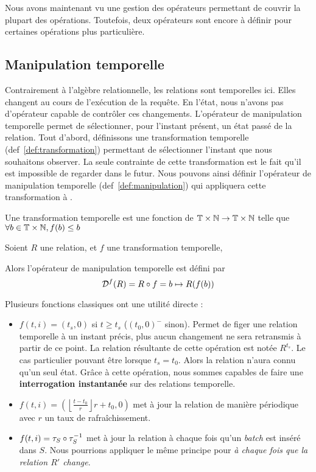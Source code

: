 Nous avons maintenant vu une gestion des opérateurs permettant de couvrir la plupart des opérations. Toutefois, deux opérateurs sont encore à définir pour certaines opérations plus particulière.
\subsection{Manipulation temporelle}
Contrairement à l'algèbre relationnelle, les relations sont temporelles ici. Elles changent au cours de l'exécution de la requête. En l'état, nous n'avons pas d'opérateur capable de contrôler ces changements. L'opérateur de manipulation temporelle permet de sélectionner, pour l'instant présent, un état passé de la relation. Tout d'abord, définissons une transformation temporelle (def~\ref{def:transformation}) permettant de sélectionner l'instant que nous souhaitons observer. La seule contrainte de cette transformation est le fait qu'il est impossible de regarder dans le futur. Nous pouvons ainsi définir l'opérateur de manipulation temporelle (def~\ref{def:manipulation}) qui appliquera cette transformation à .
\begin{defi}\label{def:transformation}
    Une transformation temporelle est une fonction de $\mathbb{T}\times\mathbb{N}\to\mathbb{T}\times\mathbb{N}$ telle que $\forall b\in\mathbb{T}\times\mathbb{N}, f(b) \leq b$
\end{defi}

\begin{defi}\label{def:manipulation}
    Soient $R$ une relation, et $f$ une transformation temporelle,

    Alors l'opérateur de manipulation temporelle est défini par $$\mathcal{D}^f(R) = R \circ f = b \mapsto R(f(b))$$
\end{defi}

Plusieurs fonctions classiques ont une utilité directe :
\begin{itemize}
 \item $f(t,i)=(t_s,0)$ si $t \geq t_s$ ($(t_0,0)^-$ sinon). Permet de figer une relation temporelle à un instant précis, plus aucun changement ne sera retransmis à partir de ce point. La relation résultante de cette opération est notée $R^{t_s}$. Le cas particulier pouvant être lorsque $t_s=t_0$. Alors la relation n'aura connu qu'un seul état. Grâce à cette opération, nous sommes capables de faire une \textbf{interrogation instantanée} sur des relations temporelle.
 \item $f(t,i)=\left(\left\lfloor\frac{t-t_0}{r}\right\rfloor r + t_0, 0\right)$ met à jour la relation de manière périodique avec $r$ un taux de rafraîchissement.
 \item $f(t,i)=\tau_S\circ\tau^{-1}_S$ met à jour la relation à chaque fois qu'un \textit{batch} est inséré dans $S$. Nous pourrions appliquer le même principe pour \textit{à chaque fois que la relation $R'$ change}.
\end{itemize}

